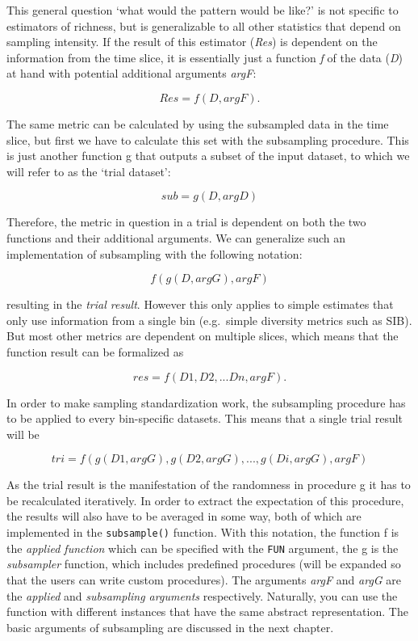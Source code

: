 \documentclass[]{article}
\begin{document}
This general question `what would the pattern would be like?' is not
specific to estimators of richness, but is generalizable to all other
statistics that depend on sampling intensity. If the result of this
estimator (\emph{Res}) is dependent on the information from the time
slice, it is essentially just a function \emph{f} of the data (\emph{D})
at hand with potential additional arguments \emph{argF}:

\[Res= f(D, argF).\]

The same metric can be calculated by using the subsampled data in the
time slice, but first we have to calculate this set with the subsampling
procedure. This is just another function g that outputs a subset of the
input dataset, to which we will refer to as the `trial dataset':

\[sub = g(D, argD)\]

Therefore, the metric in question in a trial is dependent on both the
two functions and their additional arguments. We can generalize such an
implementation of subsampling with the following notation:

\[f(g(D, argG), argF)\]

resulting in the \emph{trial result}. However this only applies to
simple estimates that only use information from a single bin
(e.g.~simple diversity metrics such as SIB). But most other metrics are
dependent on multiple slices, which means that the function result can
be formalized as

\[res = f(D1, D2,... Dn, argF).\]

In order to make sampling standardization work, the subsampling
procedure has to be applied to every bin-specific datasets. This means
that a single trial result will be

\[tri = f(g(D1, argG), g(D2, argG),..., g(Di, argG), argF) \]

As the trial result is the manifestation of the randomness in procedure
g it has to be recalculated iteratively. In order to extract the
expectation of this procedure, the results will also have to be averaged
in some way, both of which are implemented in the \texttt{subsample()}
function. With this notation, the function f is the \emph{applied
function} which can be specified with the \texttt{FUN} argument, the g
is the \emph{subsampler} function, which includes predefined procedures
(will be expanded so that the users can write custom procedures). The
arguments \emph{argF} and \emph{argG} are the \emph{applied} and
\emph{subsampling arguments} respectively. Naturally, you can use the
function with different instances that have the same abstract
representation. The basic arguments of subsampling are discussed in the
next chapter.
\end{document}
